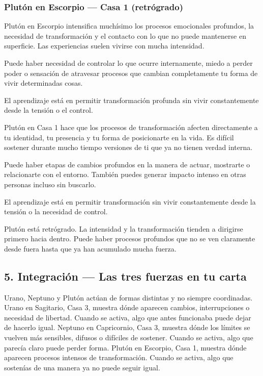 \documentclass[11pt,a4paper]{article}
\begin{document}
\subsubsection*{Plutón en Escorpio — Casa 1 (retrógrado)}

Plutón en Escorpio intensifica muchísimo los procesos emocionales profundos, la necesidad de transformación y el contacto con lo que no puede mantenerse en superficie. Las experiencias suelen vivirse con mucha intensidad.

Puede haber necesidad de controlar lo que ocurre internamente, miedo a perder poder o sensación de atravesar procesos que cambian completamente tu forma de vivir determinadas cosas.

El aprendizaje está en permitir transformación profunda sin vivir constantemente desde la tensión o el control.

Plutón en Casa 1 hace que los procesos de transformación afecten directamente a tu identidad, tu presencia y tu forma de posicionarte en la vida. Es difícil sostener durante mucho tiempo versiones de ti que ya no tienen verdad interna.

Puede haber etapas de cambios profundos en la manera de actuar, mostrarte o relacionarte con el entorno. También puedes generar impacto intenso en otras personas incluso sin buscarlo.

El aprendizaje está en permitir transformación sin vivir constantemente desde la tensión o la necesidad de control.

Plutón está retrógrado. La intensidad y la transformación tienden a dirigirse primero hacia dentro. Puede haber procesos profundos que no se ven claramente desde fuera hasta que ya han acumulado mucha fuerza.

\vspace{0.8cm}

\subsection{5. Integración — Las tres fuerzas en tu carta}

Urano, Neptuno y Plutón actúan de formas distintas y no siempre coordinadas. Urano en Sagitario, Casa 3, muestra dónde aparecen cambios, interrupciones o necesidad de libertad. Cuando se activa, algo que antes funcionaba puede dejar de hacerlo igual. Neptuno en Capricornio, Casa 3, muestra dónde los límites se vuelven más sensibles, difusos o difíciles de sostener. Cuando se activa, algo que parecía claro puede perder forma. Plutón en Escorpio, Casa 1, muestra dónde aparecen procesos intensos de transformación. Cuando se activa, algo que sostenías de una manera ya no puede seguir igual.
\end{document}
